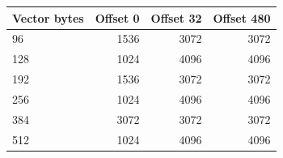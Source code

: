 \begin{tabular}{lrrr}
\toprule
Vector bytes & Offset 0 & Offset 32 & Offset 480 \\
\midrule
96 & 1536 & 3072 & 3072 \\
128 & 1024 & 4096 & 4096 \\
192 & 1536 & 3072 & 3072 \\
256 & 1024 & 4096 & 4096 \\
384 & 3072 & 3072 & 3072 \\
512 & 1024 & 4096 & 4096 \\
\bottomrule
\end{tabular}
